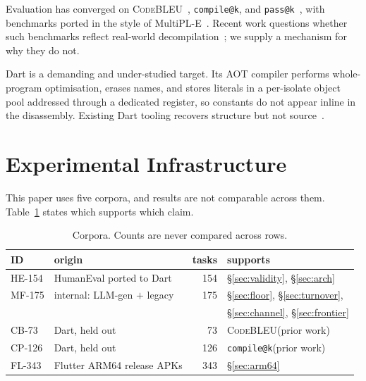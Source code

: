 \documentclass[conference]{IEEEtran}
\makeatletter
\newcommand{\codebleu}{\textsc{CodeBLEU}\xspace}
\newcommand{\passatk}{\texttt{pass@k}\xspace}
\newcommand{\compileatk}{\texttt{compile@k}\xspace}
\makeatother
\begin{document}
Evaluation has converged on \codebleu~\cite{ren2020codebleu}, \compileatk, and
\passatk~\cite{chen2021evaluating}, with benchmarks ported in the style of
MultiPL-E~\cite{cassano2023multiple}. Recent work questions whether such
benchmarks reflect real-world decompilation~\cite{decompilebench2025}; we supply
a mechanism for why they do not.

Dart is a demanding and under-studied target. Its AOT compiler performs
whole-program optimisation, erases names, and stores literals in a per-isolate
object pool addressed through a dedicated register, so constants do not appear
inline in the disassembly. Existing Dart tooling recovers structure but not
source~\cite{blutter,reflutter,jebdartaot}.

\section{Experimental Infrastructure}
\label{sec:infra}
This paper uses five corpora, and results are not comparable across them.
Table~\ref{tab:corpora} states which supports which claim.

\begin{table}[t]
\caption{Corpora. Counts are never compared across rows.}
\label{tab:corpora}
\centering\scriptsize
\begin{tabular}{@{}llrl@{}}
\toprule
\textbf{ID} & \textbf{origin} & \textbf{tasks} & \textbf{supports}\\
\midrule
HE-154 & HumanEval ported to Dart      & 154 & \S\ref{sec:validity}, \S\ref{sec:arch}\\
MF-175 & internal: LLM-gen $+$ legacy   & 175 & \S\ref{sec:floor}, \S\ref{sec:turnover},\\
       &                               &     & \S\ref{sec:channel}, \S\ref{sec:frontier}\\
CB-73  & Dart, held out                &  73 & \codebleu (prior work)\\
CP-126 & Dart, held out                & 126 & \compileatk (prior work)\\
FL-343 & Flutter ARM64 release APKs    & 343 & \S\ref{sec:arm64}\\
\bottomrule
\end{tabular}
\end{table}
\end{document}
